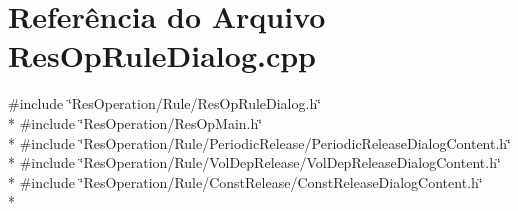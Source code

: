 \section{Referência do Arquivo Res\+Op\+Rule\+Dialog.\+cpp}
\label{_rule_2_res_op_rule_dialog_8cpp}
{\ttfamily \#include \char`\"{}Res\+Operation/\+Rule/\+Res\+Op\+Rule\+Dialog.\+h\char`\"{}}\\*
{\ttfamily \#include \char`\"{}Res\+Operation/\+Res\+Op\+Main.\+h\char`\"{}}\\*
{\ttfamily \#include \char`\"{}Res\+Operation/\+Rule/\+Periodic\+Release/\+Periodic\+Release\+Dialog\+Content.\+h\char`\"{}}\\*
{\ttfamily \#include \char`\"{}Res\+Operation/\+Rule/\+Vol\+Dep\+Release/\+Vol\+Dep\+Release\+Dialog\+Content.\+h\char`\"{}}\\*
{\ttfamily \#include \char`\"{}Res\+Operation/\+Rule/\+Const\+Release/\+Const\+Release\+Dialog\+Content.\+h\char`\"{}}\\*
